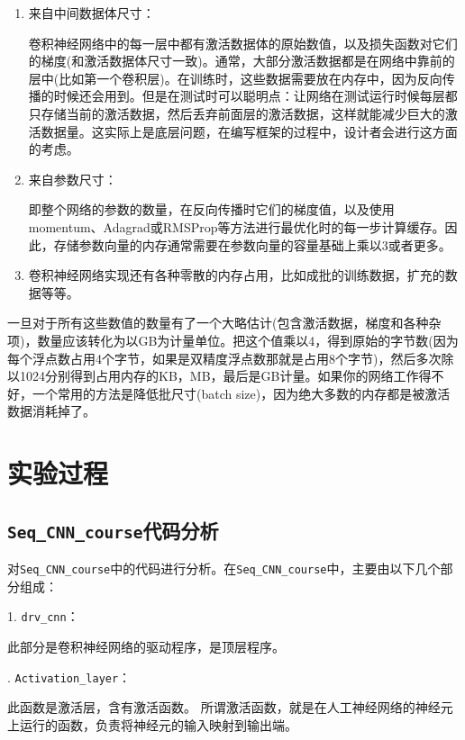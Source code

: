 \documentclass[UTF-8, a4paper, 12pt]{ctexart}
\begin{document}
\begin{enumerate}
    \item 来自中间数据体尺寸：
    
    卷积神经网络中的每一层中都有激活数据体的原始数值，以及损失函数对它们的梯度(和激活数据体尺寸一致)。通常，大部分激活数据都是在网络中靠前的层中(比如第一个卷积层)。在训练时，这些数据需要放在内存中，因为反向传播的时候还会用到。但是在测试时可以聪明点：让网络在测试运行时候每层都只存储当前的激活数据，然后丢弃前面层的激活数据，这样就能减少巨大的激活数据量。这实际上是底层问题，在编写框架的过程中，设计者会进行这方面的考虑。
    \item 来自参数尺寸：
    
    即整个网络的参数的数量，在反向传播时它们的梯度值，以及使用momentum、Adagrad或RMSProp等方法进行最优化时的每一步计算缓存。因此，存储参数向量的内存通常需要在参数向量的容量基础上乘以3或者更多。

    \item 卷积神经网络实现还有各种零散的内存占用，比如成批的训练数据，扩充的数据等等。
\end{enumerate}

一旦对于所有这些数值的数量有了一个大略估计(包含激活数据，梯度和各种杂项)，数量应该转化为以GB为计量单位。把这个值乘以4，得到原始的字节数(因为每个浮点数占用4个字节，如果是双精度浮点数那就是占用8个字节)，然后多次除以1024分别得到占用内存的KB，MB，最后是GB计量。如果你的网络工作得不好，一个常用的方法是降低批尺寸(batch size)，因为绝大多数的内存都是被激活数据消耗掉了。
\section{实验过程}

\subsection{\colorbox[gray]{0.9}{\texttt{Seq\_CNN\_course}}代码分析}
对\colorbox[gray]{0.9}{\texttt{Seq\_CNN\_course}}中的代码进行分析。在\colorbox[gray]{0.9}{\texttt{Seq\_CNN\_course}}中，主要由以下几个部分组成：

1. \colorbox[gray]{0.9}{\texttt{drv\_cnn}}：

此部分是卷积神经网络的驱动程序，是顶层程序。

. \colorbox[gray]{0.9}{\texttt{Activation\_layer}}：

此函数是激活层，含有激活函数。
    所谓激活函数，就是在人工神经网络的神经元上运行的函数，负责将神经元的输入映射到输出端。
\end{document}
